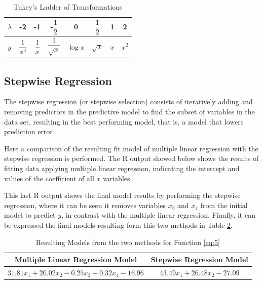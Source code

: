 \documentclass[10pt,leter,openany]{article}
\begin{document}
		\begin{table}[]
			\centering
			\caption{Tukey's Ladder of Transformations}
			\label{tab:ladders}
			\begin{tabular}{@{}|l|ccccccc|@{}}
				\toprule
				\textbf{$\lambda$} & -2                & -1            & -$\dfrac{1}{2}$      & 0       & $\dfrac{1}{2}$ & 1   & 2       \\ \midrule
				\textbf{$y$}       & $\dfrac{1}{x^{2}}$ & $\dfrac{1}{x}$ & $\dfrac{1}{\sqrt{x}}$ & $\log x$ & $\sqrt{x}$     & $x$ & $x^{2}$ \\ \bottomrule
			\end{tabular}
		\end{table}

	\subsection{Stepwise Regression}

		The stepwise regression (or stepwise selection) consists of iteratively adding and removing predictors in the predictive model to find the subset of variables in the data set, resulting in the best performing model, that is, a model that lowers prediction error \citep{kassambara2018stepwise}. 
		
		Here a comparison of the resulting fit model of multiple linear regression with the stepwise regression is performed. The R output showed below shows the results of fitting data applying multiple linear regression, indicating the intercept and values of the coefficient of all $x$ variables.
		

		This last R output shows the final model results by performing the stepwise regression, where it can be seen it removes variables $x_{3} $ and $ x_{4} $ from the initial model to predict $y$, in contrast with the multiple linear regression. Finally, it can be expressed the final models resulting form this two methods in Table \ref{tab:models}.
		
		
		\begin{table}[]
			\centering
			\caption{Resulting Models from the two methods for Function \ref{eq:5}}
			\label{tab:models}
			\begin{tabular}{@{}cc@{}}
				\toprule
				\textbf{Multiple Linear Regression Model} & \textbf{Stepwise Regression Model} \\ \midrule
				    $31.81x_{1 }   + 20.02x_{2} - 0.25x_{3}    + 0.32x_{4 } - 16.96$    &           $43.49 x_{1}  + 26.48x_{2} - 27.09$ \\  \bottomrule
			\end{tabular}
		\end{table}
		
\clearpage

	
	
	
\end{document}
